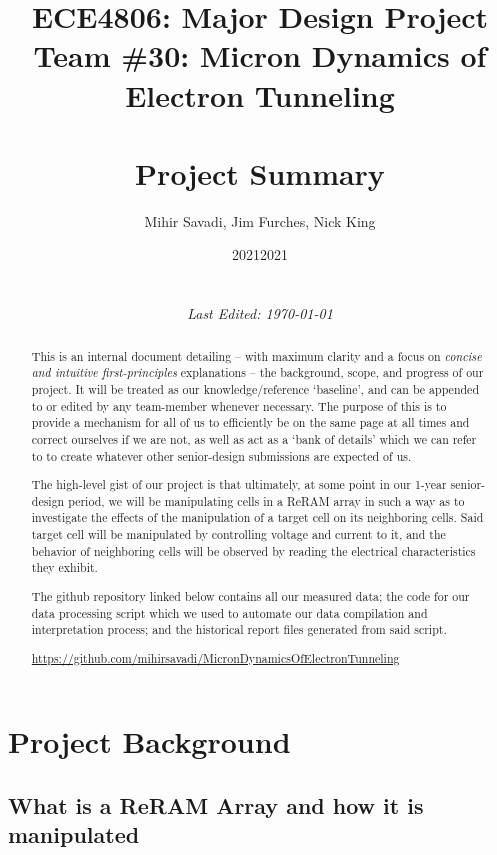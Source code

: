 \documentclass{article}
\date{2021}
\title{ECE4806: Major Design Project \\ Team \#30: Micron Dynamics of Electron Tunneling \\ \phantom{spacer} \\
  \textbf{Project Summary}}
\author{Mihir Savadi, Jim Furches, Nick King}
\date{2021 \\ \phantom{spacer} \\ \phantom{spacer} \\ \textit{Last Edited: \today}}
\begin{document}
    \maketitle

    \renewcommand{\abstractname}{Purpose}
    \begin{abstract}
        This is an internal document detailing -- with maximum clarity and a focus on \textit{concise and intuitive
        first-principles} explanations -- the background, scope, and progress of our project. It will be treated as our
        knowledge/reference `baseline', and can be appended to or edited by any team-member whenever necessary. The
        purpose of this is to provide a mechanism for all of us to efficiently be on the same page at all times and
        correct ourselves if we are not, as well as act as a `bank of details' which we can refer to to create whatever
        other senior-design submissions are expected of us.

        The high-level gist of our project is that ultimately, at some point in our 1-year senior-design period, we will
        be manipulating cells in a ReRAM array in such a way as to investigate the effects of the manipulation of a
        target cell on its neighboring cells. Said target cell will be manipulated by controlling voltage and current to
        it, and the behavior of neighboring cells will be observed by reading the electrical characteristics they
        exhibit.

        The github repository linked below contains all our measured data; the code for our data processing script which
        we used to automate our data compilation and interpretation process; and the historical report files generated
        from said script.

        \url{https://github.com/mihirsavadi/MicronDynamicsOfElectronTunneling}
    \end{abstract}

    \newpage
    \tableofcontents
    
    \newpage
    \section{Project Background}
          
      \subsection{What is a ReRAM Array and how it is manipulated}
\end{document}
